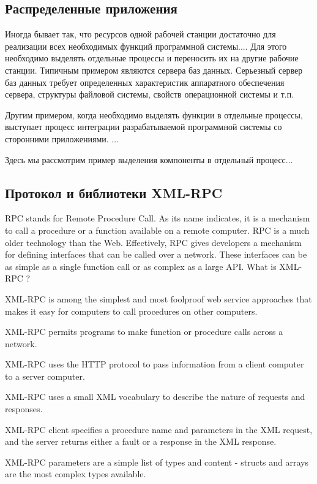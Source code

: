\documentclass[a4paper,openany,twoside,final]{book}
\begin{document}
\subsection{Распределенные приложения}
\label{sec:distributedapps}

Иногда бывает так, что ресурсов одной рабочей станции достаточно для реализации всех необходимых функций программной системы.... Для этого необходимо выделять отдельные процессы и переносить их на другие рабочие станции.  Типичным примером являются сервера баз данных.  Серьезный сервер баз данных требует определенных характеристик аппаратного обеспечения сервера, структуры файловой системы, свойств операционной системы и т.п.

Другим примером, когда необходимо выделять функции в отдельные процессы, выступает процесс интеграции разрабатываемой программной системы со сторонними приложениями.  ...

Здесь мы рассмотрим пример выделения компоненты в отдельный процесс...

\subsection{Протокол и библиотеки XML-RPC}
\label{sec:xmlrpc}

RPC stands for Remote Procedure Call. As its name indicates, it is a mechanism to call a procedure or a function available on a remote computer. RPC is a much older technology than the Web. Effectively, RPC gives developers a mechanism for defining interfaces that can be called over a network. These interfaces can be as simple as a single function call or as complex as a large API.
What is XML-RPC ?

XML-RPC is among the simplest and most foolproof web service approaches that makes it easy for computers to call procedures on other computers.

    XML-RPC permits programs to make function or procedure calls across a network.

    XML-RPC uses the HTTP protocol to pass information from a client computer to a server computer.

    XML-RPC uses a small XML vocabulary to describe the nature of requests and responses.

    XML-RPC client specifies a procedure name and parameters in the XML request, and the server returns either a fault or a response in the XML response.

    XML-RPC parameters are a simple list of types and content - structs and arrays are the most complex types available.
\end{document}
